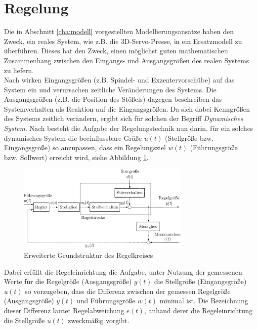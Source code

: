 \section{Regelung}


Die in Abschnitt \ref{cha:modell} vorgestellten Modellierungsansätze haben den Zweck, ein reales System, wie z.B. die 3D-Servo-Presse, in ein Ersatzmodell zu überführen. Dieses hat den Zweck, einen möglichst guten mathematischen Zusammenhang zwischen den Eingangs- und Ausgangsgrößen des realen Systems zu liefern. \\
Nach \cite{Lunze.2013} wirken Eingangsgrößen (z.B. Spindel- und Exzentervorschübe) auf das System ein und verursachen zeitliche Veränderungen des Systems. Die Ausgangsgrößen (z.B. die Position des Stößels) dagegen beschreiben das Systemverhalten als Reaktion auf die Eingangsgrößen. Da sich dabei Kenngrößen des Systems zeitlich verändern, ergibt sich für solchen der Begriff \textit{Dynamisches System}. Nach \cite{Lunze.2013} besteht die Aufgabe der Regelungstechnik nun darin, für ein solches dynamisches System die beeinflussbare Größe $u(t)$ (Stellgröße bzw. Eingangsgröße) so anzupassen, dass ein Regelungsziel $w(t)$ (Führungsgröße bzw. Sollwert) erreicht wird, siehe Abbildung \ref{fig:regelkreis}.

\begin{figure} 
	\centering
	\includegraphics[width=0.75\textwidth]{images/Regelkreis}
	\caption{Erweiterte Grundstruktur des Regelkreises \cite{Lunze.2013}}
	\label{fig:regelkreis}
\end{figure}




Dabei erfüllt die Regeleinrichtung die Aufgabe, unter Nutzung der gemessenen Werte für die Regelgröße (Ausgangsgröße) $y(t)$ die Stellgröße (Eingangsgröße) $u(t)$ so vorzugeben, dass die Differenz zwischen der gemessen Regelgröße (Ausgangsgröße) $y(t)$ und Führungsgröße $w(t)$ minimal ist.  Die Bezeichnung dieser Differenz lautet Regelabweichung $e(t)$, anhand derer die Regeleinrichtung die Stellgröße $u(t)$ zweckmäßig vorgibt. \cite{Lunze.2013}
  

